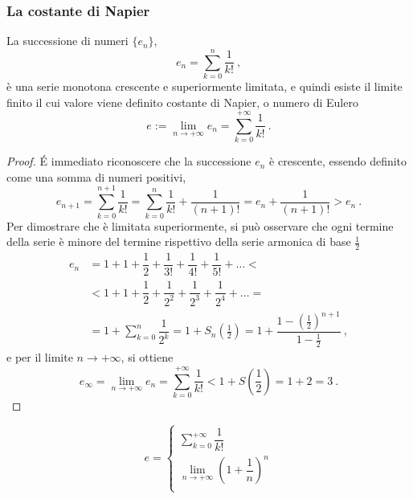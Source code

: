 \subsubsection{La costante di Napier}
\begin{definition}
La successione di numeri $\{ e_n \}$,
\begin{equation}
    e_n = \sum_{k=0}^{n} \frac{1}{k!} \ ,
\end{equation}
è una serie monotona crescente e superiormente limitata, e quindi esiste il limite finito il cui valore viene definito costante di Napier, o numero di Eulero
\begin{equation}
   e := \lim_{n \rightarrow +\infty} e_n = \sum_{k=0}^{+\infty} \frac{1}{k!} \ . 
\end{equation}
\end{definition}
\begin{proof}
\'E immediato riconoscere che la successione $e_n$ è crescente, essendo definito come una somma di numeri positivi,
\begin{equation}
    e_{n+1} = \sum_{k=0}^{n+1} \dfrac{1}{k!} = \sum_{k=0}^{n} \dfrac{1}{k!} + \dfrac{1}{(n+1)!} = e_n + \dfrac{1}{(n+1)!} > e_n \ .
\end{equation}
Per dimostrare che è limitata superiormente, si può osservare che ogni termine della serie è minore del termine rispettivo della serie armonica di base $\frac{1}{2}$
\begin{equation}
\begin{aligned}
    e_{n}
    & = 1 + 1 + \dfrac{1}{2} + \dfrac{1}{3!} + \dfrac{1}{4!}  + \dfrac{1}{5!}  + \dots < \\
    & < 1 + 1 + \dfrac{1}{2} + \dfrac{1}{2^2}+ \dfrac{1}{2^3} + \dfrac{1}{2^4} + \dots = \\
    & = 1 + \sum_{k=0}^{n} \dfrac{1}{2^k} = 1 + S_n\left(\frac{1}{2}\right) 
      = 1 + \dfrac{1 - \left(\frac{1}{2}\right)^{n+1}}{1 - \frac{1}{2}} \ ,
\end{aligned}
\end{equation}
e per il limite $n \rightarrow +\infty$, si ottiene
\begin{equation}
    e_{\infty} = \lim_{n \rightarrow +\infty} e_n = \sum_{k=0}^{+\infty} \dfrac{1}{k!} < 1 + S\left(\dfrac{1}{2}\right) = 1 + 2 = 3 \ .
\end{equation}
\end{proof}
\begin{definition}
\begin{equation}
    e = 
    \begin{cases}
        \displaystyle\sum_{k=0}^{+\infty} \dfrac{1}{k!} \\
        \displaystyle\lim_{n \rightarrow +\infty} \left( 1 + \dfrac{1}{n} \right)^n \\ 
    \end{cases}
\end{equation}
\end{definition}

